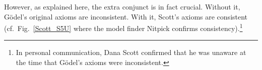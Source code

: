 \documentclass{llncs}
\begin{document}

However, as explained here, the extra conjunct is in
fact crucial. Without it, G\"odel's original axioms are
inconsistent. With it, Scott's axioms are consistent (cf.~Fig.~\ref{Scott_S5U}
where the model finder Nitpick \cite{Nitpick} confirms consistency).\footnote{In
  personal communication, Dana Scott confirmed that he was unaware
  at the time that G\"odel's axioms were inconsistent.}




\end{document}
